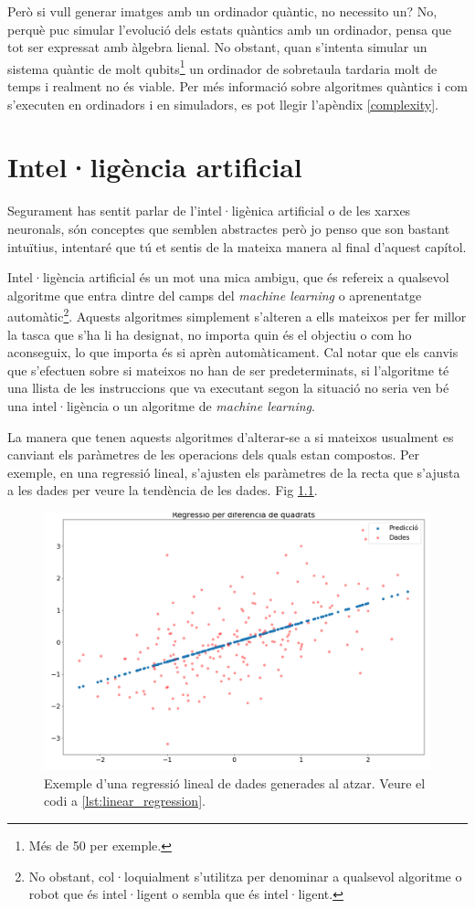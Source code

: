 Però si vull generar imatges amb un ordinador quàntic, no necessito un? No, perquè puc simular l'evolució dels estats quàntics amb un ordinador, pensa que tot ser expressat amb àlgebra lienal. No obstant, quan s'intenta simular un sistema quàntic de molt qubits\footnote{Més de 50 per exemple.} un ordinador de sobretaula tardaria molt de temps i realment no és viable. Per més informació sobre algoritmes quàntics i com s'executen en ordinadors i en simuladors, es pot llegir l'apèndix \ref{complexity}.  


\chapter{Intel·ligència artificial}

Segurament has sentit parlar de l'intel·ligènica artificial o de les xarxes neuronals, són conceptes que semblen abstractes però jo penso que son bastant intuïtius, intentaré que tú et sentis de la mateixa manera al final d'aquest capítol. 

Intel·ligència artificial és un mot una mica ambigu, que és refereix a qualsevol algoritme que entra dintre del camps del \textit{machine learning} o aprenentatge automàtic\footnote{No obstant, col·loquialment s'utilitza per denominar a qualsevol algoritme o robot que és intel·ligent o sembla que és intel·ligent. }. Aquests algoritmes simplement s'alteren a ells mateixos per fer millor la tasca que s'ha li ha designat, no importa quin és el objectiu o com ho aconseguix, lo que importa és si aprèn automàticament. Cal notar que els canvis que s'efectuen sobre si mateixos no han de ser predeterminats, si l'algoritme té una llista de les instruccions que va executant segon la situació no seria ven bé una intel·ligència o un algoritme de \textit{machine learning}. 

La manera que tenen aquests algoritmes d'alterar-se a si mateixos usualment es canviant els paràmetres de les operacions dels quals estan compostos. Per exemple, en una regressió lineal, s'ajusten els paràmetres de la recta que s'ajusta a les dades per veure la tendència de les dades. Fig \ref{fig:leastsquares}.

\begin{figure}
	\centering
	\includegraphics[width=0.7\linewidth]{Figures/least_squares}
	\caption{Exemple d'una regressió lineal de dades generades al atzar. Veure el codi a \ref{lst:linear_regression}.}
	\label{fig:leastsquares}
\end{figure}

